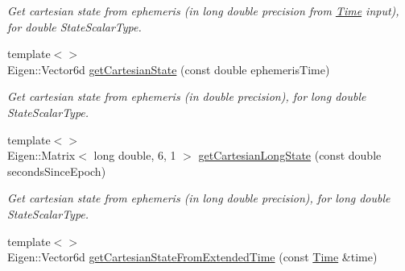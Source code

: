\begin{DoxyCompactItemize}
\begin{DoxyCompactList}\small\item\em Get cartesian state from ephemeris (in long double precision from \hyperlink{classtudat_1_1Time}{Time} input), for double State\+Scalar\+Type. \end{DoxyCompactList}\item 
{\footnotesize template$<$$>$ }\\Eigen\+::\+Vector6d \hyperlink{classtudat_1_1ephemerides_1_1TabulatedCartesianEphemeris_a5ff805936be5cbac09509772948d9765}{get\+Cartesian\+State} (const double ephemeris\+Time)\hypertarget{classtudat_1_1ephemerides_1_1TabulatedCartesianEphemeris_a5ff805936be5cbac09509772948d9765}{}\label{classtudat_1_1ephemerides_1_1TabulatedCartesianEphemeris_a5ff805936be5cbac09509772948d9765}

\begin{DoxyCompactList}\small\item\em Get cartesian state from ephemeris (in double precision), for long double State\+Scalar\+Type. \end{DoxyCompactList}\item 
{\footnotesize template$<$$>$ }\\Eigen\+::\+Matrix$<$ long double, 6, 1 $>$ \hyperlink{classtudat_1_1ephemerides_1_1TabulatedCartesianEphemeris_a81f8d1e4c5133fd7d3cae7e73a80b74e}{get\+Cartesian\+Long\+State} (const double seconds\+Since\+Epoch)\hypertarget{classtudat_1_1ephemerides_1_1TabulatedCartesianEphemeris_a81f8d1e4c5133fd7d3cae7e73a80b74e}{}\label{classtudat_1_1ephemerides_1_1TabulatedCartesianEphemeris_a81f8d1e4c5133fd7d3cae7e73a80b74e}

\begin{DoxyCompactList}\small\item\em Get cartesian state from ephemeris (in long double precision), for long double State\+Scalar\+Type. \end{DoxyCompactList}\item 
{\footnotesize template$<$$>$ }\\Eigen\+::\+Vector6d \hyperlink{classtudat_1_1ephemerides_1_1TabulatedCartesianEphemeris_a714c87550efb01972cce14d1b5720389}{get\+Cartesian\+State\+From\+Extended\+Time} (const \hyperlink{classtudat_1_1Time}{Time} \&time)\hypertarget{classtudat_1_1ephemerides_1_1TabulatedCartesianEphemeris_a714c87550efb01972cce14d1b5720389}{}\label{classtudat_1_1ephemerides_1_1TabulatedCartesianEphemeris_a714c87550efb01972cce14d1b5720389}


\end{DoxyCompactItemize}
